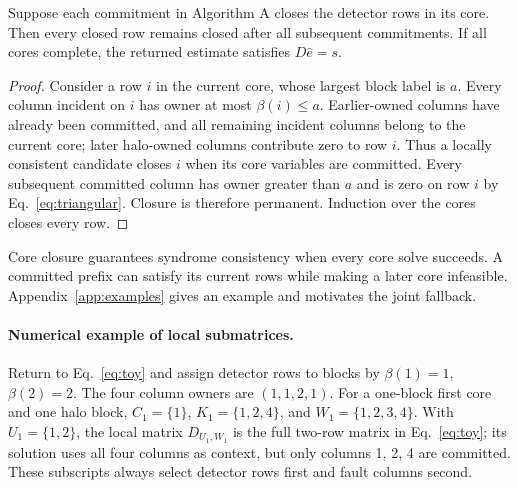 \begin{theorem}\label{thm:closure}
Suppose each commitment in Algorithm A closes the detector rows in its core. Then every closed row remains closed after all subsequent commitments. If all cores complete, the returned estimate satisfies $D\hat e=s$.
\end{theorem}
\begin{proof}
Consider a row $i$ in the current core, whose largest block label is $a$. Every column incident on $i$ has owner at most $\beta(i)\le a$. Earlier-owned columns have already been committed, and all remaining incident columns belong to the current core; later halo-owned columns contribute zero to row $i$. Thus a locally consistent candidate closes $i$ when its core variables are committed. Every subsequent committed column has owner greater than $a$ and is zero on row $i$ by Eq.~\eqref{eq:triangular}. Closure is therefore permanent. Induction over the cores closes every row.
\end{proof}
Core closure guarantees syndrome consistency when every core solve succeeds. A committed prefix can satisfy its current rows while making a later core infeasible. Appendix~\ref{app:examples} gives an example and motivates the joint fallback.

\paragraph{Numerical example of local submatrices.}
Return to Eq.~\eqref{eq:toy} and assign detector rows to blocks by $\beta(1)=1$, $\beta(2)=2$. The four column owners are $(1,1,2,1)$. For a one-block first core and one halo block, $C_1=\{1\}$, $K_1=\{1,2,4\}$, and $W_1=\{1,2,3,4\}$. With $U_1=\{1,2\}$, the local matrix $D_{U_1,W_1}$ is the full two-row matrix in Eq.~\eqref{eq:toy}; its solution uses all four columns as context, but only columns 1, 2, 4 are committed. These subscripts always select detector rows first and fault columns second.

